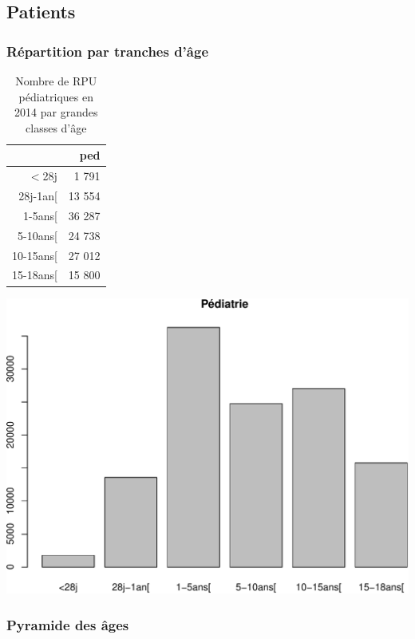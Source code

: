 \documentclass[]{article}
\begin{document}
\subsection{Patients}\label{patients-1}

\subsubsection{Répartition par tranches
d'âge}\label{repartition-par-tranches-dage}

\begin{table}[ht]
\centering
\begin{tabular}{rr}
  \hline
 & ped \\ 
  \hline
$<$28j & 1 791 \\ 
  28j-1an[ & 13 554 \\ 
  1-5ans[ & 36 287 \\ 
  5-10ans[ & 24 738 \\ 
  10-15ans[ & 27 012 \\ 
  15-18ans[ & 15 800 \\ 
   \hline
\end{tabular}
\caption{Nombre de RPU pédiatriques en 2014 par grandes classes d'âge} 
\end{table}

\includegraphics{rapport2014_V4_files/figure-latex/unnamed-chunk-9-1.pdf}

\subsubsection{Pyramide des âges}\label{pyramide-des-ages}
\end{document}
